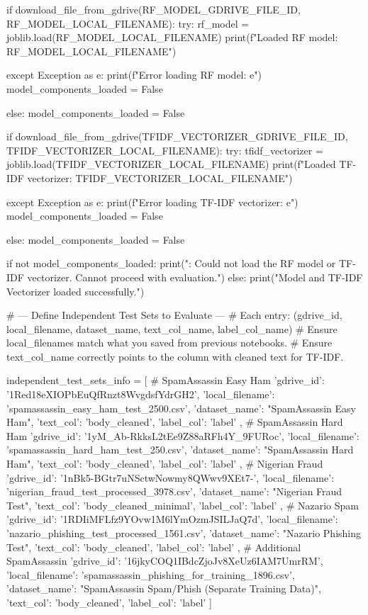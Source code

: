 \begin{ffcode}
if download_file_from_gdrive(RF_MODEL_GDRIVE_FILE_ID, RF_MODEL_LOCAL_FILENAME):
    try:
        rf_model = joblib.load(RF_MODEL_LOCAL_FILENAME)
        print(f"Loaded RF model: {RF_MODEL_LOCAL_FILENAME}")

    except Exception as e:
        print(f"Error loading RF model: {e}")
        model_components_loaded = False

else:
    model_components_loaded = False

if download_file_from_gdrive(TFIDF_VECTORIZER_GDRIVE_FILE_ID, TFIDF_VECTORIZER_LOCAL_FILENAME):
    try:
        tfidf_vectorizer = joblib.load(TFIDF_VECTORIZER_LOCAL_FILENAME)
        print(f"Loaded TF-IDF vectorizer: {TFIDF_VECTORIZER_LOCAL_FILENAME}")

    except Exception as e:
        print(f"Error loading TF-IDF vectorizer: {e}")
        model_components_loaded = False

else:
    model_components_loaded = False

if not model_components_loaded:
    print("\nERROR: Could not load the RF model or TF-IDF vectorizer. Cannot proceed with evaluation.")
else:
    print("\nRF Model and TF-IDF Vectorizer loaded successfully.")

# --- Define Independent Test Sets to Evaluate ---
# Each entry: (gdrive_id, local_filename, dataset_name, text_col_name, label_col_name)
# Ensure local_filenames match what you saved from previous notebooks.
# Ensure text_col_name correctly points to the column with cleaned text for TF-IDF.

independent_test_sets_info = [
    # SpamAssassin Easy Ham
    {
        'gdrive_id': '1Red18eXIOPbEuQfRnzt8WvgdsfYdrGH2',
        'local_filename': 'spamassassin_easy_ham_test_2500.csv',
        'dataset_name': "SpamAssassin Easy Ham",
        'text_col': 'body_cleaned',
        'label_col': 'label'
    },
    # SpamAssassin Hard Ham
    {
        'gdrive_id': '1yM_Ab-RkksL2tEe9Z88aRFh4Y_9FURoc',
        'local_filename': 'spamassassin_hard_ham_test_250.csv',
        'dataset_name': "SpamAssassin Hard Ham",
        'text_col': 'body_cleaned',
        'label_col': 'label'
    },
    # Nigerian Fraud
    {
        'gdrive_id': '1nBk5-BGtr7uNSctwNowmy8QWwv9XEt7-',
        'local_filename': 'nigerian_fraud_test_processed_3978.csv',
        'dataset_name': "Nigerian Fraud Test",
        'text_col': 'body_cleaned_minimal',
        'label_col': 'label'
    },
    # Nazario Spam
    {
        'gdrive_id': '1RDIiMFLfz9YOvw1M6lYmOzmJSILJaQ7d',
        'local_filename': 'nazario_phishing_test_processed_1561.csv',
        'dataset_name': "Nazario Phishing Test",
        'text_col': 'body_cleaned',
        'label_col': 'label'
    },
    # Additional SpamAssassin
    {
        'gdrive_id': '16jkyCOQ1IBdcZjoJv8XeUz6IAM7UmrRM',
        'local_filename': 'spamassassin_phishing_for_training_1896.csv',
        'dataset_name': "SpamAssassin Spam/Phish (Separate Training Data)",
        'text_col': 'body_cleaned',
        'label_col': 'label'
    }
]


\end{ffcode}
